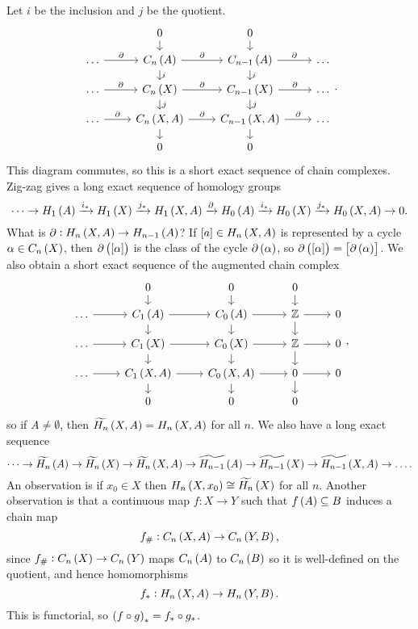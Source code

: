 Let $ i $ be the inclusion and $ j $ be the quotient.
$$
\begin{tikzcd}[row sep=small]
& 0 \arrow{d} & 0 \arrow{d} & \\
\dots \arrow{r}{\partial} & C_n\br{A} \arrow{r}{\partial} \arrow{d}{i} & C_{n - 1}\br{A} \arrow{r}{\partial} \arrow{d}{i} & \dots \\
\dots \arrow{r}{\partial} & C_n\br{X} \arrow{r}{\partial} \arrow{d}{j} & C_{n - 1}\br{X} \arrow{r}{\partial} \arrow{d}{j} & \dots \\
\dots \arrow{r}{\partial} & C_n\br{X, A} \arrow{r}{\partial} \arrow{d} & C_{n - 1}\br{X, A} \arrow{r}{\partial} \arrow{d} & \dots \\
& 0 & 0 &
\end{tikzcd}.
$$
This diagram commutes, so this is a short exact sequence of chain complexes. Zig-zag gives a long exact sequence of homology groups
$$ \dots \to H_1\br{A} \xrightarrow{i_*} H_1\br{X} \xrightarrow{j_*} H_1\br{X, A} \xrightarrow{\partial} H_0\br{A} \xrightarrow{i_*} H_0\br{X} \xrightarrow{j_*} H_0\br{X, A} \to 0. $$
What is $ \partial : H_n\br{X, A} \to H_{n - 1}\br{A} $? If $ \sbr{a} \in H_n\br{X, A} $ is represented by a cycle $ \alpha \in C_n\br{X} $, then $ \partial\br{\sbr{\alpha}} $ is the class of the cycle $ \partial\br{\alpha} $, so $ \partial\br{\sbr{\alpha}} = \sbr{\partial\br{\alpha}} $. We also obtain a short exact sequence of the augmented chain complex
$$
\begin{tikzcd}[row sep=small]
& 0 \arrow{d} & 0 \arrow{d} & 0 \arrow{d} & \\
\dots \arrow{r} & C_1\br{A} \arrow{r} \arrow{d} & C_0\br{A} \arrow{r} \arrow{d} & \Z \arrow{r} \arrow{d} & 0 \\
\dots \arrow{r} & C_1\br{X} \arrow{r} \arrow{d} & C_0\br{X} \arrow{r} \arrow{d} & \Z \arrow{r} \arrow{d} & 0 \\
\dots \arrow{r} & C_1\br{X, A} \arrow{r} \arrow{d} & C_0\br{X, A} \arrow{r} \arrow{d} & 0 \arrow{r} \arrow{d} & 0 \\
& 0 & 0 & 0 &
\end{tikzcd},
$$
so if $ A \ne \emptyset $, then $ \widetilde{H_n}\br{X, A} = H_n\br{X, A} $ for all $ n $. We also have a long exact sequence
$$ \dots \to \widetilde{H_n}\br{A} \to \widetilde{H_n}\br{X} \to \widetilde{H_n}\br{X, A} \to \widetilde{H_{n - 1}}\br{A} \to \widetilde{H_{n - 1}}\br{X} \to \widetilde{H_{n - 1}}\br{X, A} \to \dots. $$
An observation is if $ x_0 \in X $ then $ H_n\br{X, x_0} \cong \widetilde{H_n}\br{X} $ for all $ n $. Another observation is that a continuous map $ f : X \to Y $ such that $ f\br{A} \subseteq B $ induces a chain map
$$ f_\# : C_n\br{X, A} \to C_n\br{Y, B}, $$
since $ f_\# : C_n\br{X} \to C_n\br{Y} $ maps $ C_n\br{A} $ to $ C_n\br{B} $ so it is well-defined on the quotient, and hence homomorphisms
$$ f_* : H_n\br{X, A} \to H_n\br{Y, B}. $$
This is functorial, so $ \br{f \circ g}_* = f_* \circ g_* $.

